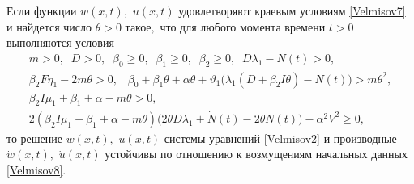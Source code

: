 \smallskip

\hypertarget{Velm:th1}{}

\begin{theorem}[1]Если функции $w(x,t),$ $u(x,t)$ удовлетворяют краевым условиям \eqref{Velmisov7} и найдется число $\theta>0$ такое$,$ что для любого момента времени $t>0$ выполняются условия 
\begin{gather} 
\label{Velmisov12} 
m>0,\; \; D>0,\; \; \beta _{0} \ge 0,\; \; \beta _{1} \ge 0,\; \; \beta _{2} \ge 0,\; \; D\lambda _{1} -N(t) > 0,
\\
\label{Velmisov13} 
 \beta _{2}F \eta _{1} -2m\theta > 0, \; \; \;
\beta _{0} +\beta _{1} \theta +\alpha \theta +\vartheta _{1} \bigl(\lambda _{1} (D+\beta _{2}I \theta )-N(t)\bigr)>m\theta ^{2}, 
\\
\label{Velmisov14} 
\beta _{2}I \mu _{1} +\beta _{1} +\alpha-m\theta > 0,     
\\ 
\label{Velmisov15} 
2\left(\beta _{2} I\mu _{1} +\beta_{1} +\alpha -m\theta  \right)
\bigl(2\theta D\lambda _{1}+\dot{N}(t) - 2\theta N(t)\bigr)-\alpha ^{2} V^{2} \ge 0,
\end{gather} 
то решение $w(x,t),$ $u(x,t)$ системы уравнений \eqref{Velmisov2} и производные $\dot{w}(x,t),$ $\dot{u}(x,t)$ устойчивы по отношению к возмущениям начальных данных \eqref{Velmisov8}$.$
\end{theorem}

\smallskip

